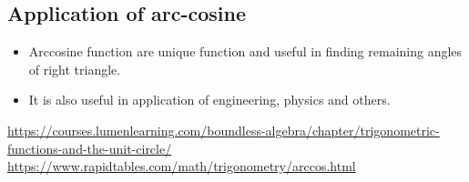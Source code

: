 \documentclass[a4paper,10pt]{report}
\begin{document}
\subsection{Application of arc-cosine}
\begin{itemize}[noitemsep]
\item Arccosine function are unique function and useful in finding remaining angles of right triangle.
\item It is also useful in application of engineering, physics and others.
\end{itemize}


\begin{thebibliography}{9}
\url{https://courses.lumenlearning.com/boundless-algebra/chapter/trigonometric-functions-and-the-unit-circle/}
\url{https://www.rapidtables.com/math/trigonometry/arccos.html}
\end{thebibliography}
\end{document}
